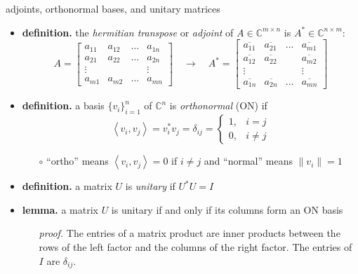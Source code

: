 \documentclass[10pt,hyperref]{beamer}
\newcommand{\CC}{\mathbb{C}}
\newcommand{\ip}[2]{\left<#1,#2\right>}
\begin{document}
\begin{frame}{adjoints, orthonormal bases, and unitary matrices}

\begin{itemize}
\item \textbf{definition.} the \emph{hermitian transpose} or \emph{adjoint} of $A\in \CC^{m\times n}$ is $A^* \in \CC^{n\times m}$:
    $$A = \begin{bmatrix}
    a_{11} & a_{12} & \dots & a_{1n} \\
    a_{21} & a_{22} & \dots & a_{2n} \\
    \vdots &        &       & \vdots \\
    a_{m1} & a_{m2} & \dots & a_{mn} \end{bmatrix}
    \quad \to \quad
    A^* = \begin{bmatrix}
    \overline{a_{11}} & \overline{a_{21}} & \dots & \overline{a_{m1}} \\
    \overline{a_{12}} & \overline{a_{22}} &       & \overline{a_{m2}} \\
    \vdots            &                   &       & \vdots \\
    \overline{a_{1n}} & \overline{a_{2n}} & \dots & \overline{a_{mn}} \end{bmatrix}$$
\item \textbf{definition.} a basis $\{v_i\}_{i=1}^n$ of $\CC^n$ is \emph{orthonormal} (ON) if
\small
    $$\ip{v_i}{v_j} =v_i^* v_j = \delta_{ij} = \begin{cases} 1, & i=j \\ 0, & i\ne j \end{cases}$$
\normalsize
\vspace{-2mm}
    \begin{itemize}
    \item[$\circ$] ``ortho'' means $\ip{v_i}{v_j}=0$ if $i\ne j$ and ``normal'' means $\|v_i\|=1$
    \end{itemize}
\item \textbf{definition.} a matrix $U$ is \emph{unitary} if $U^* U = I$
\item \textbf{lemma.} a matrix $U$ is unitary if and only if its columns form an ON basis
    \begin{itemize}
    \item[\emph{proof.}] The entries of a matrix product are inner products between the rows of the left factor and the columns of the right factor.  The entries of $I$ are $\delta_{ij}$.
    \end{itemize}
\end{itemize}
\end{frame}
\end{document}
